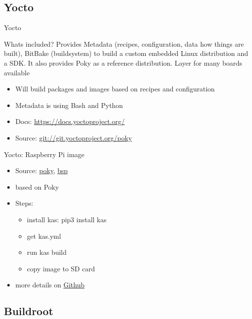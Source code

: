 \documentclass{beamer}
\begin{document}
\subsection{Yocto}

\begin{frame}{Yocto}
	\begin{block}{Whats included?}
		Provides Metadata (recipes, configuration, data how things are built), BitBake (buildsystem) to build a custom embedded Linux distribution and a SDK. It also provides Poky as a reference distribution. Layer for many boards available
	\end{block}
	\begin{itemize}
		\item Will build packages and images based on recipes and configuration
		\item Metadata is using Bash and Python
		\item Docs: \url{https://docs.yoctoproject.org/}
		\item Source: \url{git://git.yoctoproject.org/poky}
	\end{itemize}
\end{frame}

\begin{frame}{Yocto: Raspberry Pi image}
	\begin{itemize}
		\item Source: \href{https://git.yoctoproject.org/poky}{poky}, \href{https://git.yoctoproject.org/meta-raspberrypi/}{bsp}
		\item based on Poky
		\item Steps:
		\begin{itemize}
			\item install kas: pip3 install kas
			\item get kas.yml
			\item run kas build
			\item copy image to SD card
		\end{itemize}
		\item more details on \href{https://github.com/tomirgang/eh21_maintainable_linux/tree/main/examples/first_build_rpi4/yocto}{Github}
	\end{itemize}
\end{frame}

\subsection{Buildroot}
\end{document}
